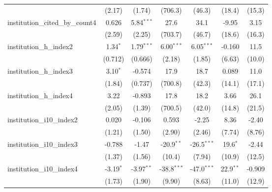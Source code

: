 \begin{tabular}{lcccccc}
                                         & (2.17)        & (1.74)        & (706.3)       & (46.3)        & (18.4)        & (15.3)\\   
   institution\_cited\_by\_count4        & 0.626         & 5.84$^{***}$  & 27.6          & 34.1          & -9.95         & 3.15\\   
                                         & (2.59)        & (2.25)        & (703.7)       & (46.7)        & (18.6)        & (16.3)\\   
   institution\_h\_index2                & 1.34$^{*}$    & 1.79$^{***}$  & 6.00$^{***}$  & 6.05$^{***}$  & -0.160        & 11.5\\   
                                         & (0.712)       & (0.666)       & (2.18)        & (1.85)        & (6.63)        & (10.0)\\   
   institution\_h\_index3                & 3.10$^{*}$    & -0.574        & 17.9          & 18.7          & 0.089         & 11.0\\   
                                         & (1.84)        & (0.737)       & (700.8)       & (42.3)        & (14.1)        & (17.1)\\   
   institution\_h\_index4                & 3.22          & -0.893        & 17.8          & 18.2          & 3.66          & 26.1\\   
                                         & (2.05)        & (1.39)        & (700.5)       & (42.0)        & (14.8)        & (21.5)\\   
   institution\_i10\_index2              & 0.020         & -0.106        & 0.593         & -2.25         & 8.36          & -2.40\\   
                                         & (1.21)        & (1.50)        & (2.90)        & (2.46)        & (7.74)        & (8.76)\\   
   institution\_i10\_index3              & -0.788        & -1.47         & -20.9$^{**}$  & -26.5$^{***}$ & 19.6$^{*}$    & -2.44\\   
                                         & (1.37)        & (1.56)        & (10.4)        & (7.94)        & (10.9)        & (12.5)\\   
   institution\_i10\_index4              & -3.19$^{*}$   & -3.97$^{**}$  & -38.8$^{***}$ & -47.0$^{***}$ & 22.9$^{**}$   & -0.909\\   
                                         & (1.73)        & (1.90)        & (9.90)        & (8.63)        & (11.0)        & (12.9)\\   

\end{tabular}
